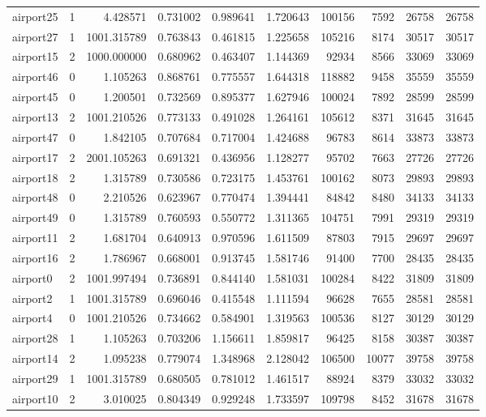 \documentclass[../../../thesis.tex]{subfiles}
\begin{document}
\begin{longtable}{|l|r|r|r|r|r|r|r|r|r|}
airport25 & 1 & 4.428571 & 0.731002 & 0.989641 & 1.720643 & 100156 & 7592 & 26758 & 26758 \\
airport27 & 1 & 1001.315789 & 0.763843 & 0.461815 & 1.225658 & 105216 & 8174 & 30517 & 30517 \\
airport15 & 2 & 1000.000000 & 0.680962 & 0.463407 & 1.144369 & 92934 & 8566 & 33069 & 33069 \\
airport46 & 0 & 1.105263 & 0.868761 & 0.775557 & 1.644318 & 118882 & 9458 & 35559 & 35559 \\
airport45 & 0 & 1.200501 & 0.732569 & 0.895377 & 1.627946 & 100024 & 7892 & 28599 & 28599 \\
airport13 & 2 & 1001.210526 & 0.773133 & 0.491028 & 1.264161 & 105612 & 8371 & 31645 & 31645 \\
airport47 & 0 & 1.842105 & 0.707684 & 0.717004 & 1.424688 & 96783 & 8614 & 33873 & 33873 \\
airport17 & 2 & 2001.105263 & 0.691321 & 0.436956 & 1.128277 & 95702 & 7663 & 27726 & 27726 \\
airport18 & 2 & 1.315789 & 0.730586 & 0.723175 & 1.453761 & 100162 & 8073 & 29893 & 29893 \\
airport48 & 0 & 2.210526 & 0.623967 & 0.770474 & 1.394441 & 84842 & 8480 & 34133 & 34133 \\
airport49 & 0 & 1.315789 & 0.760593 & 0.550772 & 1.311365 & 104751 & 7991 & 29319 & 29319 \\
airport11 & 2 & 1.681704 & 0.640913 & 0.970596 & 1.611509 & 87803 & 7915 & 29697 & 29697 \\
airport16 & 2 & 1.786967 & 0.668001 & 0.913745 & 1.581746 & 91400 & 7700 & 28435 & 28435 \\
airport0 & 2 & 1001.997494 & 0.736891 & 0.844140 & 1.581031 & 100284 & 8422 & 31809 & 31809 \\
airport2 & 1 & 1001.315789 & 0.696046 & 0.415548 & 1.111594 & 96628 & 7655 & 28581 & 28581 \\
airport4 & 0 & 1001.210526 & 0.734662 & 0.584901 & 1.319563 & 100536 & 8127 & 30129 & 30129 \\
airport28 & 1 & 1.105263 & 0.703206 & 1.156611 & 1.859817 & 96425 & 8158 & 30387 & 30387 \\
airport14 & 2 & 1.095238 & 0.779074 & 1.348968 & 2.128042 & 106500 & 10077 & 39758 & 39758 \\
airport29 & 1 & 1001.315789 & 0.680505 & 0.781012 & 1.461517 & 88924 & 8379 & 33032 & 33032 \\
airport10 & 2 & 3.010025 & 0.804349 & 0.929248 & 1.733597 & 109798 & 8452 & 31678 & 31678 \\

\end{longtable}
\end{document}
